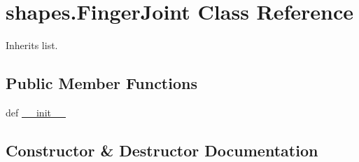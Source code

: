 \hypertarget{classshapes_1_1_finger_joint}{}\section{shapes.\+Finger\+Joint Class Reference}
\label{classshapes_1_1_finger_joint}


Inherits list.

\subsection*{Public Member Functions}
\begin{DoxyCompactItemize}
\item 
def \hyperlink{classshapes_1_1_finger_joint_ae4184d844b9cddcc482723c807e92784}{\+\_\+\+\_\+init\+\_\+\+\_\+}
\end{DoxyCompactItemize}


\subsection{Constructor \& Destructor Documentation}
\hypertarget{classshapes_1_1_finger_joint_ae4184d844b9cddcc482723c807e92784}{}
